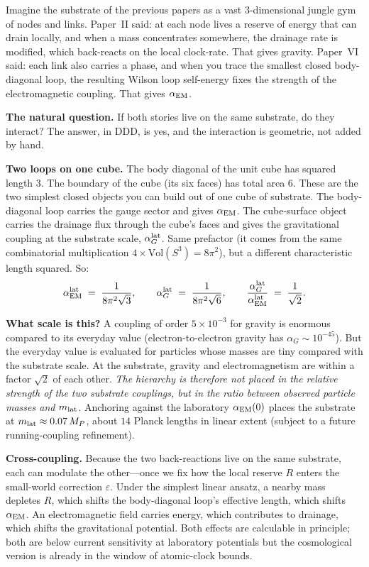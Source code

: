 \documentclass[11pt,a4paper]{article}
\begin{document}
Imagine the substrate of the previous papers as a vast
3-dimensional jungle gym of nodes and links. Paper~II said: at
each node lives a reserve of energy that can drain locally, and
when a mass concentrates somewhere, the drainage rate is
modified, which back-reacts on the local clock-rate.
That gives gravity. Paper~VI said: each link also carries a
phase, and when you trace the smallest closed body-diagonal
loop, the resulting Wilson loop self-energy fixes the strength
of the electromagnetic coupling. That gives $\alpha_{\rm EM}$.

\textbf{The natural question.} If both stories live on the
same substrate, do they interact? The answer, in DDD, is yes,
and the interaction is geometric, not added by hand.

\textbf{Two loops on one cube.} The body diagonal of the unit
cube has squared length $3$. The boundary of the cube (its six
faces) has total area $6$. These are the two simplest closed
objects you can build out of one cube of substrate. The
body-diagonal loop carries the gauge sector and gives
$\alpha_{\rm EM}$. The cube-surface object carries the drainage
flux through the cube's faces and gives the gravitational
coupling at the substrate scale, $\alpha_G^{\rm lat}$. Same
prefactor (it comes from the same combinatorial multiplication
$4 \times \mathrm{Vol}(S^3) = 8\pi^2$), but a different
characteristic length squared. So:
\begin{equation*}
\alpha_{\rm EM}^{\rm lat} \;=\; \frac{1}{8\pi^2\sqrt{3}},
\qquad
\alpha_G^{\rm lat} \;=\; \frac{1}{8\pi^2\sqrt{6}},
\qquad
\frac{\alpha_G^{\rm lat}}{\alpha_{\rm EM}^{\rm lat}}
\;=\; \frac{1}{\sqrt{2}}.
\end{equation*}

\textbf{What scale is this?} A coupling of order $5 \times
10^{-3}$ for gravity is enormous compared to its everyday value
(electron-to-electron gravity has $\alpha_G \sim 10^{-45}$). But
the everyday value is evaluated for particles whose masses are
tiny compared with the substrate scale. At the substrate,
gravity and electromagnetism are within a factor $\sqrt{2}$ of
each other. \emph{The hierarchy is therefore not placed in the
relative strength of the two substrate couplings, but in the
ratio between observed particle masses and $m_{\rm lat}$.}
Anchoring against the laboratory $\alpha_{\rm EM}(0)$ places the
substrate at $m_{\rm lat} \approx 0.07\,M_P$, about $14$ Planck
lengths in linear extent (subject to a future running-coupling
refinement).

\textbf{Cross-coupling.} Because the two back-reactions live on
the same substrate, each can modulate the other---once we fix
how the local reserve $R$ enters the small-world correction
$\varepsilon$. Under the simplest linear ansatz, a nearby mass
depletes $R$, which shifts the body-diagonal loop's effective
length, which shifts $\alpha_{\rm EM}$. An electromagnetic field
carries energy, which contributes to drainage, which shifts the
gravitational potential. Both effects are calculable in
principle; both are below current sensitivity at laboratory
potentials but the cosmological version is already in the
window of atomic-clock bounds.
\end{document}
